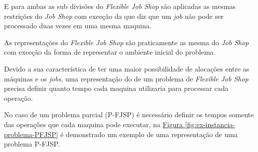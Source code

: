 \indent E para ambas as sub divisões do \textit{Flexible Job Shop} são aplicadas as mesmas restrições do \textit{Job Shop} com exceção da que diz que um \textit{job} não pode ser processado duas vezes em uma mesma maquina.


As representações do \textit{Flexible Job Shop} são praticamente as mesma do \textit{Job Shop} com exceção da forma de representar o ambiente inicial do problema. 


Devido a sua característica de ter uma maior possibilidade de alocações entre as máquinas e os \textit{jobs}, 
%
uma representação do de um problema de \textit{Flexible Job Shop} precisa definir quanto tempo cada maquina utilizaria para processar cada operação.


No caso de um problema parcial (P-FJSP) é necessário definir os tempos somente das operações que cada maquina pode executar, na 
\hyperref[fig:ex-instancia-problema-PFJSP]{Figura \ref{fig:ex-instancia-problema-PFJSP}}
é demonstrado um exemplo de uma representação de uma problema P-FJSP.
